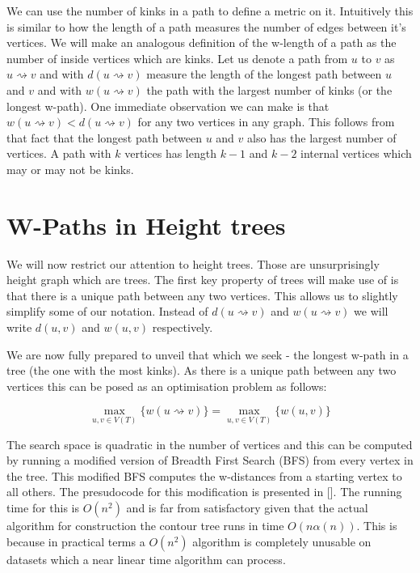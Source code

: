 We can use the number of kinks in a path to define a metric on it. Intuitively this is similar to how the length of a path measures the number of edges between it's vertices. We will make an analogous definition of the w-length of a path as the number of inside vertices which are kinks. Let us denote a path from $u$ to $v$ as $u \rightsquigarrow v$ and with $d(u \rightsquigarrow v)$ measure the length of the longest path between $u$ and $v$ and with $w(u \rightsquigarrow v)$ the path with the largest number of kinks (or the longest w-path). One immediate observation we can make is that $w(u \rightsquigarrow v) < d(u \rightsquigarrow v)$ for any two vertices in any graph. This follows from that fact that the longest path between $u$ and $v$ also has the largest number of vertices. A path with $k$ vertices has length $k-1$ and $k-2$ internal vertices which may or may not be kinks.


\section{W-Paths in Height trees}

We will now restrict our attention to height trees. Those are unsurprisingly height graph which are trees. The first key property of trees will make use of is that there is a unique path between any two vertices. This allows us to slightly simplify some of our notation.  Instead of  $d(u \rightsquigarrow v)$ and $w(u \rightsquigarrow v)$ we will write $d(u, v)$ and $w(u, v)$ respectively.  

We are now fully prepared to unveil that which we seek - the longest w-path in a tree (the one with the most kinks). As there is a unique path between any two vertices this can be posed as an optimisation problem as follows:

$$ \max_{u, v \in V(T)}\{ w(u \rightsquigarrow v) \} =  \max_{u, v \in V(T)}\{ w(u, v) \} $$

The search space is quadratic in the number of vertices and this can be computed by running a modified version of Breadth First Search (BFS) from every vertex in the tree. This modified BFS computes the w-distances from a starting vertex to all others. The presudocode for this modification is presented in []. The running time for this is $O(n^2)$ and is far from satisfactory given that the actual algorithm for construction the contour tree runs in time $O(n\alpha(n))$. This is because in practical terms a $O(n^2)$ algorithm is completely unusable on datasets which a near linear time algorithm can process.

